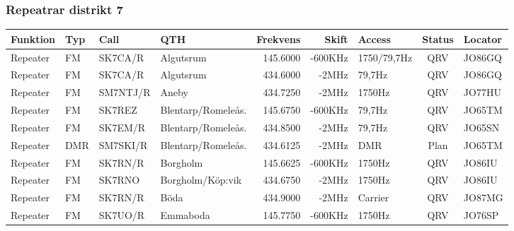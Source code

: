 \begin{landscape}
\subsubsection{Repeatrar distrikt 7}
\footnotesize
\begin{longtable}{llllrrlcl}
	\textbf{Funktion}         & \textbf{Typ}  & \textbf{Call} & \textbf{QTH}        & \textbf{Frekvens} & \textbf{Skift} & \textbf{Access}  & \textbf{Status} & \textbf{Locator} \\ \hline
\endhead
	Repeater                  & FM            & SK7CA/R       & Algutsrum           & 145.6000          & -600KHz        & 1750/79,7Hz      & QRV             & JO86GQ           \\
	Repeater                  & FM            & SK7CA/R       & Algutsrum           & 434.6000          & -2MHz          & 79,7Hz           & QRV             & JO86GQ           \\
	Repeater                  & FM            & SM7NTJ/R      & Aneby               & 434.7250          & -2MHz          & 1750Hz           & QRV             & JO77HU           \\
	Repeater                  & FM            & SK7REZ        & Blentarp/Romeleås.  & 145.6750          & -600KHz        & 79,7Hz           & QRV             & JO65TM           \\
	Repeater                  & FM            & SK7EM/R       & Blentarp/Romeleås.  & 434.8500          & -2MHz          & 79,7Hz           & QRV             & JO65SN           \\
	Repeater                  & DMR           & SM7SKI/R      & Blentarp/Romeleås.  & 434.6125          & -2MHz          & DMR              & Plan            & JO65TM           \\
	Repeater                  & FM            & SK7RN/R       & Borgholm            & 145.6625          & -600KHz        & 1750Hz           & QRV             & JO86IU           \\
	Repeater                  & FM            & SK7RNO        & Borgholm/Köp:vik    & 434.6750          & -2MHz          & 1750Hz           & QRV             & JO86IU           \\
	Repeater                  & FM            & SK7RN/R       & Böda                & 434.9000          & -2MHz          & Carrier          & QRV             & JO87MG           \\
	Repeater                  & FM            & SK7UO/R       & Emmaboda            & 145.7750          & -600KHz        & 1750Hz           & QRV             & JO76SP           \\

\end{longtable}
\end{landscape}
